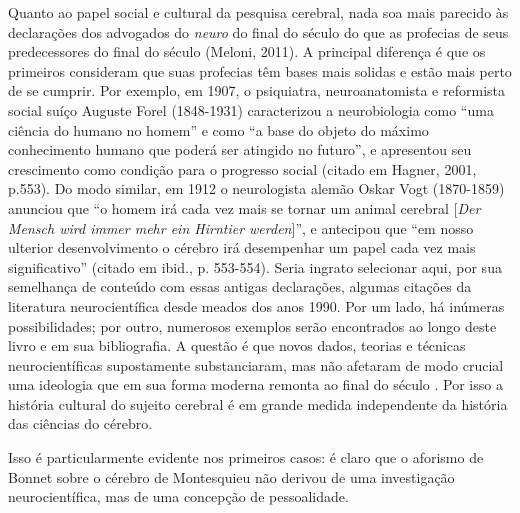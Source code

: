 Quanto ao papel social e cultural da pesquisa cerebral, nada soa mais
parecido às declarações dos advogados do \emph{neuro} do final do século
 do que as profecias de seus predecessores do final do século 
(Meloni, 2011). A principal diferença é que os primeiros consideram que
suas profecias têm bases mais solidas e estão mais perto de se cumprir.
Por exemplo, em 1907, o psiquiatra, neuroanatomista e reformista social
suíço Auguste Forel (1848-1931) caracterizou a neurobiologia como ``uma
ciência do humano no homem'' e como ``a base do objeto do máximo
conhecimento humano que poderá ser atingido no futuro'', e apresentou
seu crescimento como condição para o progresso social (citado em Hagner,
2001, p.553). Do modo similar, em 1912 o neurologista alemão Oskar Vogt
(1870-1859) anunciou que ``o homem irá cada vez mais se tornar um animal
cerebral {[}\emph{Der Mensch wird immer mehr ein Hirntier werden}{]}'',
e antecipou que ``em nosso ulterior desenvolvimento o cérebro irá
desempenhar um papel cada vez mais significativo'' (citado em ibid., p.
553-554). Seria ingrato selecionar aqui, por sua semelhança de conteúdo
com essas antigas declarações, algumas citações da literatura
neurocientífica desde meados dos anos 1990. Por um lado, há inúmeras
possibilidades; por outro, numerosos exemplos serão encontrados ao longo
deste livro e em sua bibliografia. A questão é que novos dados, teorias
e técnicas neurocientíficas supostamente substanciaram, mas não afetaram
de modo crucial uma ideologia que em sua forma moderna remonta ao final
do século . Por isso a história cultural do sujeito cerebral é em
grande medida independente da história das ciências do cérebro.

Isso é particularmente evidente nos primeiros casos: é claro que o
aforismo de Bonnet sobre o cérebro de Montesquieu não derivou de uma
investigação neurocientífica, mas de uma concepção de pessoalidade.

